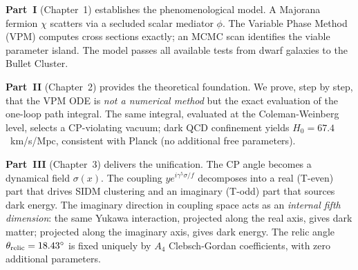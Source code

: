\documentclass[12pt,a4paper]{article}
\newcommand{\Lc}{\mathcal{L}}
\begin{document}
\begin{center}
\end{center}

\textbf{Part~I} (Chapter~1) establishes the phenomenological model.
A Majorana fermion $\chi$ scatters via a secluded scalar mediator $\phi$.
The Variable Phase Method (VPM) computes cross sections exactly; an MCMC
scan identifies the viable parameter island. The model passes all available
tests from dwarf galaxies to the Bullet Cluster.

\textbf{Part~II} (Chapter~2) provides the theoretical foundation.
We prove, step by step, that the VPM ODE is \emph{not a numerical method}
but the exact evaluation of the one-loop path integral. The same integral,
evaluated at the Coleman-Weinberg level, selects a CP-violating vacuum;
dark QCD confinement yields $H_0 = 67.4$~km/s/Mpc, consistent with
Planck (no additional free parameters).

\textbf{Part~III} (Chapter~3) delivers the unification.
The CP angle becomes a dynamical field $\sigma(x)$. The coupling
$y e^{i\gamma^5\sigma/f}$ decomposes into a real (T-even) part that drives
SIDM clustering and an imaginary (T-odd) part that sources dark energy.
The imaginary direction in coupling space acts as an \emph{internal fifth
dimension}: the same Yukawa interaction, projected along the real axis,
gives dark matter; projected along the imaginary axis, gives dark energy.
The relic angle $\theta_{\rm relic} = 18.43^\circ$ is fixed uniquely by
$A_4$ Clebsch-Gordan coefficients, with zero additional parameters.
\end{document}

